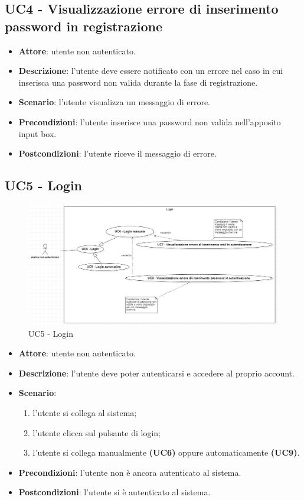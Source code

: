 \subsection{UC4 - Visualizzazione errore di inserimento password in registrazione}
\begin{itemize}
    \item \textbf{Attore}: utente non autenticato.
    \item \textbf{Descrizione}: l'utente deve essere notificato con un errore nel caso in cui inserisca una password non valida durante la fase di registrazione.
    \item \textbf{Scenario}: l'utente visualizza un messaggio di errore.
    \item \textbf{Precondizioni}: l'utente inserisce una password non valida nell'apposito input box.
    \item \textbf{Postcondizioni}: l'utente riceve il messaggio di errore.
\end{itemize}

\subsection{UC5 - Login}
\begin{figure}[!h]
    \includegraphics[width=15cm]{sezioni/Images/UC5-log.png}
    \centering
    \caption{UC5 - Login}
\end{figure}
\begin{itemize}
    \item \textbf{Attore}: utente non autenticato.
    \item \textbf{Descrizione}: l'utente deve poter autenticarsi e accedere al proprio account.
    \item \textbf{Scenario}:
    \begin{enumerate}
        \item l'utente si collega al sistema;
        \item l'utente clicca sul pulsante di login;
        \item l'utente si collega manualmente \textbf{(UC6)} oppure automaticamente \textbf{(UC9)}.
    \end{enumerate}
    \item \textbf{Precondizioni}: l'utente non è ancora autenticato al sistema.
    \item \textbf{Postcondizioni}: l'utente si è autenticato al sistema.
\end{itemize}

